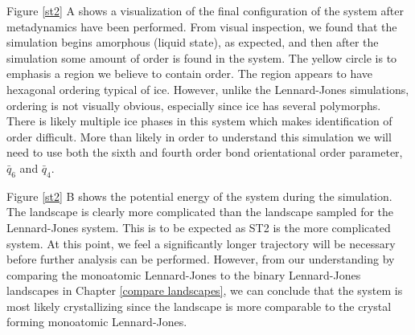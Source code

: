 Figure \ref{st2} A shows a visualization of the final configuration of the system after metadynamics have been performed.  From visual inspection, we found that the simulation begins amorphous (liquid state), as expected, and then after the simulation some amount of order is found in the system.  The yellow circle is to emphasis a region we believe to contain order.  The region appears to have hexagonal ordering typical of ice.  However, unlike the Lennard-Jones simulations, ordering is not visually obvious, especially since ice has several polymorphs.  There is likely multiple ice phases in this system which makes identification of order difficult.  More than likely in order to understand this simulation we will need to use both the sixth and fourth order bond orientational order parameter, $\bar{q}_6$ and $\bar{q}_4$.  

Figure \ref{st2} B shows the potential energy of the system during the simulation.  The landscape is clearly more complicated than the landscape sampled for the Lennard-Jones system.  This is to be expected as ST2 is the more complicated system.  At this point, we feel a significantly longer trajectory will be necessary before further analysis can be performed.  However, from our understanding by comparing the monoatomic Lennard-Jones to the binary Lennard-Jones landscapes in Chapter \ref{compare landscapes}, we can conclude that the system is most likely crystallizing since the landscape is more comparable to the crystal forming monoatomic Lennard-Jones.